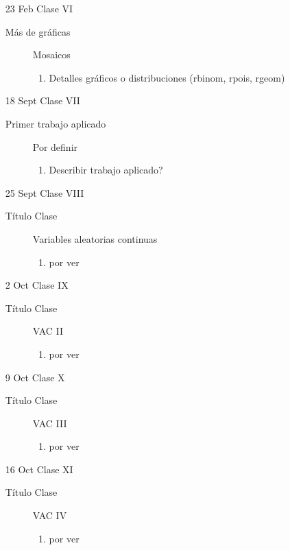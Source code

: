 \documentclass[letterpaper,12pt]{article}
\begin{document}
\begin{itemize}
  \item[23 Feb] Clase VI
  \begin{description}
  \item[Más de gráficas] Mosaicos
  \begin{enumerate}
  \item Detalles gráficos o distribuciones (rbinom, rpois, rgeom)
  \end{enumerate}
  \end{description}
  
  \item[18 Sept] Clase VII
  \begin{description}
  \item[Primer trabajo aplicado] Por definir
  \begin{enumerate}
  \item Describir trabajo aplicado?
  \end{enumerate}
  \end{description}
  
  \item[25 Sept] Clase VIII
  \begin{description}
  \item[Título Clase] Variables aleatorias continuas
  \begin{enumerate}
  \item por ver
  \end{enumerate}
  \end{description}
  
  \item[2 Oct] Clase IX
  \begin{description}
  \item[Título Clase] VAC II
  \begin{enumerate}
  \item por ver
  \end{enumerate}
  \end{description}
  
  \item[9 Oct] Clase X
  \begin{description}
  \item[Título Clase] VAC III
    \begin{enumerate}
      \item por ver
    \end{enumerate}
  \end{description}
  
  \item[16 Oct] Clase XI
  \begin{description}
  \item[Título Clase] VAC IV
  \begin{enumerate}
  \item por ver
  \end{enumerate}
  \end{description}
  

\end{itemize}
\end{document}
